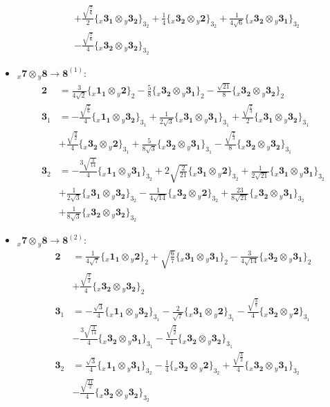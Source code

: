 \documentclass[english]{article}
\newcommand{\rep}[1]{\mathbf{#1}}
\newcommand{\repx}[2]{{}_{#2}\mathbf{#1}}
\newcommand{\subcg}[3]{\big\{ \repx{#1}{x}\otimes\repx{#2}{y}\big\}^{}_{#3}}
\begin{document}
\begin{itemize}
\begin{align*}
 & +\frac{\sqrt{\frac{7}{6}}}{2}\subcg{3_{1}}{3_{2}}{3_{2}}+\frac{1}{4}\subcg{3_{2}}{2}{3_{2}}+\frac{1}{4 \sqrt{6}}\subcg{3_{2}}{3_{1}}{3_{2}} \\ 
 & -\frac{\sqrt{\frac{7}{6}}}{4}\subcg{3_{2}}{3_{2}}{3_{2}}
\end{align*}
\item $\repx{7}{x}\otimes\repx{8}{y}\to\rep{8}^{(1)}$:
\begin{align*}
\rep{2} & = \frac{3}{4 \sqrt{2}}\subcg{1_{1}}{2}{2}-\frac{5}{8}\subcg{3_{2}}{3_{1}}{2}-\frac{\sqrt{21}}{8}\subcg{3_{2}}{3_{2}}{2}
\\
\rep{3}_{1} & = -\frac{\sqrt{\frac{7}{6}}}{4}\subcg{1_{1}}{3_{2}}{3_{1}}+\frac{1}{2 \sqrt{3}}\subcg{3_{1}}{3_{1}}{3_{1}}+\frac{\sqrt{\frac{7}{3}}}{2}\subcg{3_{1}}{3_{2}}{3_{1}} \\ 
 & +\frac{\sqrt{\frac{3}{2}}}{4}\subcg{3_{2}}{2}{3_{1}}+\frac{5}{8 \sqrt{3}}\subcg{3_{2}}{3_{1}}{3_{1}}-\frac{\sqrt{\frac{7}{3}}}{8}\subcg{3_{2}}{3_{2}}{3_{1}}
\\
\rep{3}_{2} & = -\frac{3 \sqrt{\frac{3}{14}}}{4}\subcg{1_{1}}{3_{1}}{3_{2}}+2 \sqrt{\frac{2}{21}}\subcg{3_{1}}{2}{3_{2}}+\frac{1}{2 \sqrt{21}}\subcg{3_{1}}{3_{1}}{3_{2}} \\ 
 & +\frac{1}{2 \sqrt{3}}\subcg{3_{1}}{3_{2}}{3_{2}}-\frac{1}{4 \sqrt{14}}\subcg{3_{2}}{2}{3_{2}}+\frac{23}{8 \sqrt{21}}\subcg{3_{2}}{3_{1}}{3_{2}} \\ 
 & +\frac{1}{8 \sqrt{3}}\subcg{3_{2}}{3_{2}}{3_{2}}
\end{align*}
\item $\repx{7}{x}\otimes\repx{8}{y}\to\rep{8}^{(2)}$:
\begin{align*}
\rep{2} & = \frac{1}{4 \sqrt{7}}\subcg{1_{1}}{2}{2}+\sqrt{\frac{6}{7}}\subcg{3_{1}}{3_{1}}{2}-\frac{3}{4 \sqrt{14}}\subcg{3_{2}}{3_{1}}{2} \\ 
 & +\frac{\sqrt{\frac{3}{2}}}{4}\subcg{3_{2}}{3_{2}}{2}
\\
\rep{3}_{1} & = -\frac{\sqrt{3}}{4}\subcg{1_{1}}{3_{2}}{3_{1}}-\frac{2}{\sqrt{7}}\subcg{3_{1}}{2}{3_{1}}-\frac{\sqrt{\frac{3}{7}}}{4}\subcg{3_{2}}{2}{3_{1}} \\ 
 & -\frac{3 \sqrt{\frac{3}{14}}}{4}\subcg{3_{2}}{3_{1}}{3_{1}}-\frac{\sqrt{\frac{3}{2}}}{4}\subcg{3_{2}}{3_{2}}{3_{1}}
\\
\rep{3}_{2} & = \frac{\sqrt{3}}{4}\subcg{1_{1}}{3_{1}}{3_{2}}-\frac{1}{4}\subcg{3_{2}}{2}{3_{2}}+\frac{\sqrt{\frac{3}{2}}}{4}\subcg{3_{2}}{3_{1}}{3_{2}} \\ 
 & -\frac{\sqrt{\frac{21}{2}}}{4}\subcg{3_{2}}{3_{2}}{3_{2}}

\end{align*}
\end{itemize}
\end{document}
